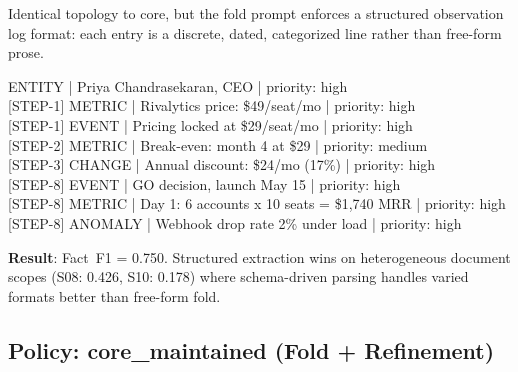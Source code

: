 \documentclass[11pt,a4paper]{article}
\begin{document}
Identical topology to core, but the fold prompt enforces a structured observation log format: each entry is a discrete, dated, categorized line rather than free-form prose.

\begin{artifactbox}[title=core-structured artifact (excerpt)]
\small\ttfamily
[STEP-1] ENTITY | Priya Chandrasekaran, CEO | priority: high\\{}
[STEP-1] METRIC | Rivalytics price: \$49/seat/mo | priority: high\\{}
[STEP-1] EVENT | Pricing locked at \$29/seat/mo | priority: high\\{}
[STEP-2] METRIC | Break-even: month 4 at \$29 | priority: medium\\{}
[STEP-3] CHANGE | Annual discount: \$24/mo (17\%) | priority: high\\{}
[STEP-8] EVENT | GO decision, launch May 15 | priority: high\\{}
[STEP-8] METRIC | Day 1: 6 accounts x 10 seats = \$1,740 MRR | priority: high\\{}
[STEP-8] ANOMALY | Webhook drop rate 2\% under load | priority: high
\end{artifactbox}

\textbf{Result}: Fact~F1 = 0.750. Structured extraction wins on heterogeneous document scopes (S08: 0.426, S10: 0.178) where schema-driven parsing handles varied formats better than free-form fold.

\subsection{Policy: core\_maintained (Fold + Refinement)}
\end{document}

